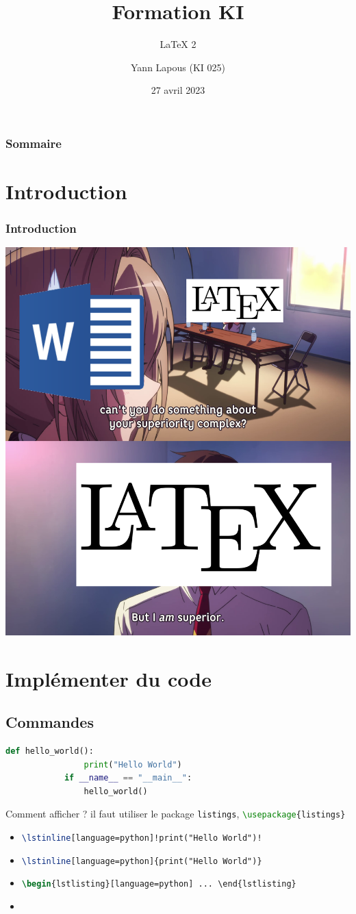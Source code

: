 \documentclass{beamer}
\title{Formation KI} %
\subtitle{LaTeX 2} %
\author{Yann Lapous (KI 025)}
\date{27 avril 2023}
\begin{document}
    \begin{frame}
        \titlepage
    \end{frame}

    \begin{frame}
        \frametitle{Sommaire}
        \setcounter{tocdepth}{1}
        \tableofcontents
    \end{frame}
    \section*{Introduction}
    \begin{frame}
        \frametitle{Introduction}
        \centering
        \includegraphics[width=.5\textwidth]{assets/image1.png}
    \end{frame}
    \section{Implémenter du code}
    \subsection{Commandes}
    \begin{frame} [allowframebreaks=1,fragile,t]
        \begin{lstlisting}[language=python]
            def hello_world():
                print("Hello World")
            if __name__ == "__main__":
                hello_world()
        \end{lstlisting}
        \begin{block}{Comment afficher ?}
            il faut utiliser le package \texttt{listings}, \lstinline[language=tex]!\usepackage{listings}!
            \begin{itemize}
            \item \lstinline[language=tex]{\lstinline[language=python]!print("Hello World")!} 
            \item \lstinline[language=tex]!\lstinline[language=python]{print("Hello World")}!
            \item \lstinline[language=tex]!\begin{lstlisting}[language=python] ... \end{lstlisting}!
            \item \lstinline[language=tex]!!
            \end{itemize}
        \end{block}
    \end{frame}
\end{document}
